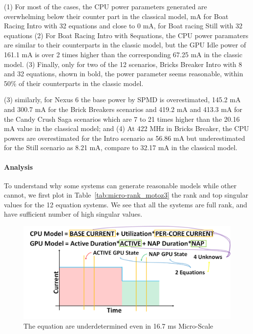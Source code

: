 (1) For most of the cases, the CPU power parameters generated are overwhelming below their
counter part in the classical model,  mA for Boat Racing Intro with 32 equations
and close to 0 mA, \eg for Boat racing Still with 32 equations
(2) For Boat Racing Intro with 8equations, the CPU power paramaters are similar to their counterparts in the classic model, but the GPU Idle power of 161.1 mA is over 2 times higher than the corresponding 67.25 mA in the classic model. 
(3) Finally, only for two of the 12 scenarios, Bricks Breaker Intro with 8 and 32 equations, shown in bold, the power parameter seems reasonable, \ie within 50\% of their counterparts in the classic model.
\fi

(3) similarly, for Nexus 6 the base power by SPMD is overestimated, 
145.2 mA and 300.7 mA for the Brick Breakers scenarios and 
419.2 mA and 413.3 mA for the Candy Crush Saga scenarios which are 7 to 21 times higher than
the 20.16 mA value in the classical model; and
(4) At 422 MHz in Bricks Breaker, 
the CPU powers are overestimated for the Intro scenario as 56.86 mA
but underestimated for the Still scenario as 8.21 mA, compare to 32.17 mA 
in the classical model.
\fi

\paragraph{Analysis}
To understand why some systems can generate reasonable models while other
cannot, we first plot in Table~\ref{tab:micro-rank_motoz3} the rank and top singular values for the 12 equation systems. We see that all the systems are full rank, and have sufficient number of
high singular values.  

\begin{figure}[tp]
    \centering
    \includegraphics[width=0.95\columnwidth]{figures/underdetermined_2.png}
    \vspace{-0.1in}
    \caption{The equation are underdetermined even in 16.7 ms Micro-Scale}
    \label{fig:micro_underdetermied}
    \vspace{-0.1in}
\end{figure}
\fi

